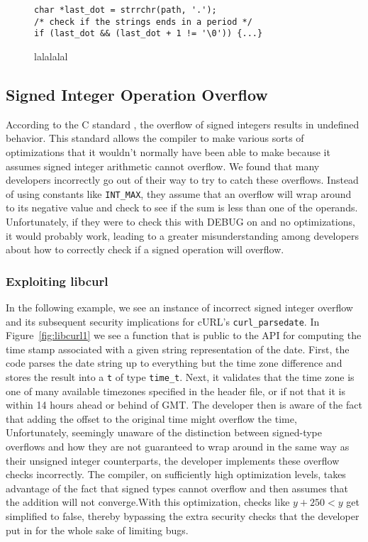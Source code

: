 \documentclass[10pt,twocolumn]{article}
\begin{document}
\begin{figure}
\begin{lstlisting}
char *last_dot = strrchr(path, '.');
/* check if the strings ends in a period */
if (last_dot && (last_dot + 1 != '\0')) {...}
\end{lstlisting}
\caption{\label{fig:svn} lalalalal}
\end{figure}

\subsection{Signed Integer Operation Overflow}
According to the C standard \cite{c11}, the overflow of signed integers results
in undefined behavior. This standard allows the compiler to make various sorts
of optimizations that it wouldn't normally have been able to make because it
assumes signed integer arithmetic cannot overflow. We found that many
developers incorrectly go out of their way to try to catch these overflows.
Instead of using constants like \texttt{INT\_MAX}, they assume that an overflow
will wrap around to its negative value and check to see if the sum is less than
one of the operands. Unfortunately, if they were to check this with DEBUG on
and no optimizations, it would probably work, leading to a greater
misunderstanding among developers about how to correctly check if a signed
operation will overflow.

\subsubsection{Exploiting libcurl}
In the following example, we see an instance of incorrect signed integer
overflow and its subsequent security implications for cURL's
\texttt{curl\_parsedate}. In Figure~\ref{fig:libcurl1} we see a function that
is public to the API for computing the time stamp associated with a given
string representation of the date. First, the code parses the date string up to
everything but the time zone difference and stores the result into a \texttt{t}
of type \texttt{time\_t}. Next, it validates that the time zone is one of many
available timezones specified in the header file, or if not that it is within
14 hours ahead or behind of GMT. The developer then is aware of the fact that
adding the offset to the original time might overflow the time, Unfortunately,
seemingly unaware of the distinction between signed-type overflows and how they
are not guaranteed to wrap around in the same way as their unsigned integer
counterparts, the developer implements these overflow checks incorrectly. The
compiler, on sufficiently high optimization levels, takes advantage of the fact
that signed types cannot overflow and then assumes that the addition will not
converge.With this optimization, checks like $y + 250 < y$ get simplified to
false, thereby bypassing the extra security checks that the developer put in
for the whole sake of limiting bugs.
\end{document}
